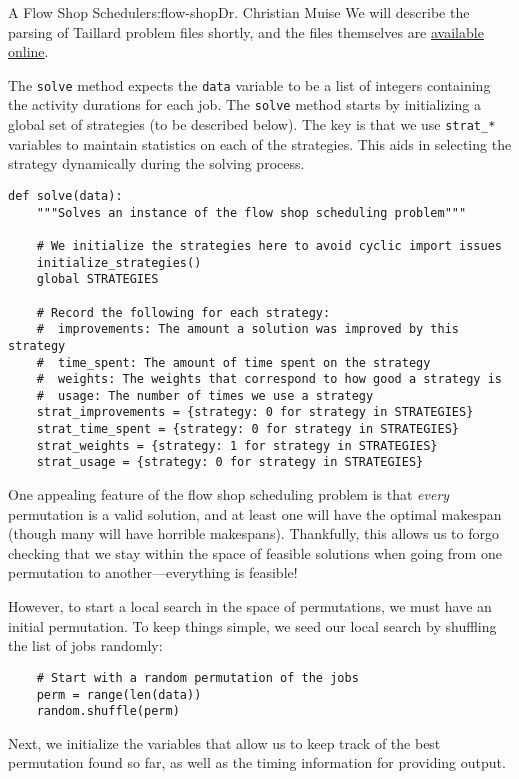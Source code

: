 \begin{aosachapter}{A Flow Shop Scheduler}{s:flow-shop}{Dr. Christian Muise}
We will describe the parsing of Taillard problem files shortly, and the
files themselves are
\href{http://mistic.heig-vd.ch/taillard/problemes.dir/ordonnancement.dir/ordonnancement.html}{available
online}.

The \texttt{solve} method expects the \texttt{data} variable to be a
list of integers containing the activity durations for each job. The
\texttt{solve} method starts by initializing a global set of strategies
(to be described below). The key is that we use \texttt{strat\_*}
variables to maintain statistics on each of the strategies. This aids in
selecting the strategy dynamically during the solving process.

\begin{verbatim}
def solve(data):
    """Solves an instance of the flow shop scheduling problem"""

    # We initialize the strategies here to avoid cyclic import issues
    initialize_strategies()
    global STRATEGIES

    # Record the following for each strategy:
    #  improvements: The amount a solution was improved by this strategy
    #  time_spent: The amount of time spent on the strategy
    #  weights: The weights that correspond to how good a strategy is
    #  usage: The number of times we use a strategy
    strat_improvements = {strategy: 0 for strategy in STRATEGIES}
    strat_time_spent = {strategy: 0 for strategy in STRATEGIES}
    strat_weights = {strategy: 1 for strategy in STRATEGIES}
    strat_usage = {strategy: 0 for strategy in STRATEGIES}
\end{verbatim}

One appealing feature of the flow shop scheduling problem is that
\emph{every} permutation is a valid solution, and at least one will have
the optimal makespan (though many will have horrible makespans).
Thankfully, this allows us to forgo checking that we stay within the
space of feasible solutions when going from one permutation to
another---everything is feasible!

However, to start a local search in the space of permutations, we must
have an initial permutation. To keep things simple, we seed our local
search by shuffling the list of jobs randomly:

\begin{verbatim}
    # Start with a random permutation of the jobs
    perm = range(len(data))
    random.shuffle(perm)
\end{verbatim}

Next, we initialize the variables that allow us to keep track of the
best permutation found so far, as well as the timing information for
providing output.


\end{aosachapter}
